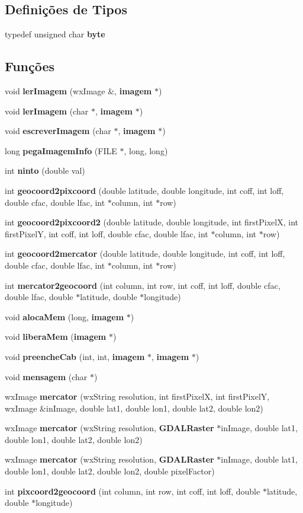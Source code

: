 \subsection*{Definições de Tipos}
\begin{DoxyCompactItemize}
\item 
typedef unsigned char {\bf byte}
\end{DoxyCompactItemize}
\subsection*{Funções}
\begin{DoxyCompactItemize}
\item 
void {\bf ler\+Imagem} (wx\+Image \&, {\bf imagem} $\ast$)
\item 
void {\bf ler\+Imagem} (char $\ast$, {\bf imagem} $\ast$)
\item 
void {\bf escrever\+Imagem} (char $\ast$, {\bf imagem} $\ast$)
\item 
long {\bf pega\+Imagem\+Info} (F\+I\+LE $\ast$, long, long)
\item 
int {\bf ninto} (double val)
\item 
int {\bf geocoord2pixcoord} (double latitude, double longitude, int coff, int loff, double cfac, double lfac, int $\ast$column, int $\ast$row)
\item 
int {\bf geocoord2pixcoord2} (double latitude, double longitude, int first\+PixelX, int first\+PixelY, int coff, int loff, double cfac, double lfac, int $\ast$column, int $\ast$row)
\item 
int {\bf geocoord2mercator} (double latitude, double longitude, int coff, int loff, double cfac, double lfac, int $\ast$column, int $\ast$row)
\item 
int {\bf mercator2geocoord} (int column, int row, int coff, int loff, double cfac, double lfac, double $\ast$latitude, double $\ast$longitude)
\item 
void {\bf aloca\+Mem} (long, {\bf imagem} $\ast$)
\item 
void {\bf libera\+Mem} ({\bf imagem} $\ast$)
\item 
void {\bf preenche\+Cab} (int, int, {\bf imagem} $\ast$, {\bf imagem} $\ast$)
\item 
void {\bf mensagem} (char $\ast$)
\item 
wx\+Image {\bf mercator} (wx\+String resolution, int first\+PixelX, int first\+PixelY, wx\+Image \&in\+Image, double lat1, double lon1, double lat2, double lon2)
\item 
wx\+Image {\bf mercator} (wx\+String resolution, {\bf G\+D\+A\+L\+Raster} $\ast$in\+Image, double lat1, double lon1, double lat2, double lon2)
\item 
wx\+Image {\bf mercator} (wx\+String resolution, {\bf G\+D\+A\+L\+Raster} $\ast$in\+Image, double lat1, double lon1, double lat2, double lon2, double pixel\+Factor)
\item 
int {\bf pixcoord2geocoord} (int column, int row, int coff, int loff, double $\ast$latitude, double $\ast$longitude)
\end{DoxyCompactItemize}
